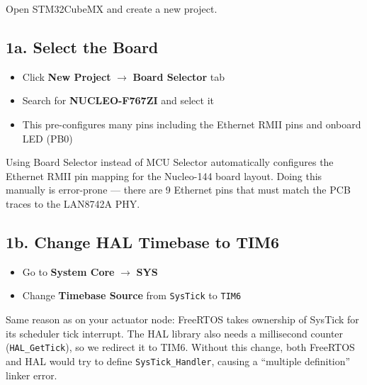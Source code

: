 \documentclass[11pt,a4paper]{article}
\begin{document}
Open STM32CubeMX and create a new project.

\subsection{1a. Select the Board}
\begin{itemize}[leftmargin=2em]
  \item Click \textbf{New Project} $\rightarrow$ \textbf{Board Selector} tab
  \item Search for \textbf{NUCLEO-F767ZI} and select it
  \item This pre-configures many pins including the Ethernet RMII pins and onboard LED (PB0)
\end{itemize}

\begin{infobox}
Using Board Selector instead of MCU Selector automatically configures the Ethernet RMII pin mapping for the Nucleo-144 board layout. Doing this manually is error-prone --- there are 9 Ethernet pins that must match the PCB traces to the LAN8742A PHY.
\end{infobox}

\subsection{1b. Change HAL Timebase to TIM6}
\begin{itemize}[leftmargin=2em]
  \item Go to \textbf{System Core} $\rightarrow$ \textbf{SYS}
  \item Change \textbf{Timebase Source} from \texttt{SysTick} to \texttt{TIM6}
\end{itemize}

\begin{infobox}
Same reason as on your actuator node: FreeRTOS takes ownership of SysTick for its scheduler tick interrupt. The HAL library also needs a millisecond counter (\texttt{HAL\_GetTick}), so we redirect it to TIM6. Without this change, both FreeRTOS and HAL would try to define \texttt{SysTick\_Handler}, causing a ``multiple definition'' linker error.
\end{infobox}
\end{document}
